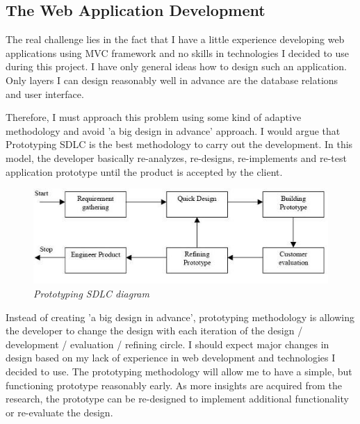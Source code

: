 \documentclass[12pt,twoside,a4paper]{report}
\begin{document}
\subsection{The Web Application Development}\label{1.6.2}
The real challenge lies in the fact that I have a little experience developing web applications using MVC framework and no skills in technologies I decided to use during this project. I have only general ideas how to design such an application. Only layers I can design reasonably well in advance are the database relations and user interface.\par
Therefore, I must approach this problem using some kind of adaptive methodology and avoid 'a big design in advance' approach. I would argue that Prototyping SDLC is the best methodology to carry out the development. In this model, the developer basically re-analyzes, re-designs, re-implements and re-test application prototype until the product is accepted by the client.
\begin{figure}[!ht]
	\centering
		\includegraphics[width=1\textwidth, totalheight=6cm]{prototyping}
	\caption{\textit{Prototyping SDLC diagram}}
	\label{f1.1}
\end{figure}
Instead of creating 'a big design in advance', prototyping methodology is allowing the developer to change the design with each iteration of the design / development / evaluation / refining circle. I should expect major changes in design based on my lack of experience in web development and technologies I decided to use. The prototyping methodology will allow me to have a simple, but functioning prototype reasonably early. As more insights are acquired from the research, the prototype can be re-designed to implement additional functionality or re-evaluate the design.

\end{document}
